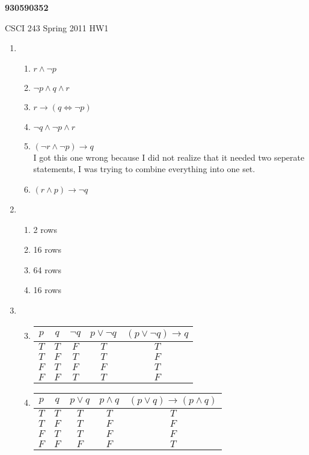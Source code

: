 \documentclass{article}
\begin{document}
\begin{center}{\bf 930590352}

CSCI 243 Spring 2011 HW1
\end{center}
\begin{enumerate}

\item
 \begin{enumerate}
  \item $r \land \neg p$ 
  \item $\neg p \land q \land r$ 
  \item $r \rightarrow (q \iff \neg p)$
  \item $\neg q \land \neg p \land r$
  \item $(\neg r \land \neg p) \rightarrow q$ \\
	I got this one wrong because I did not realize that it needed two seperate statements, I was trying to combine everything into one set.
  \item $(r \land p) \rightarrow \neg q$
 \end{enumerate}

\item
 \begin{enumerate}
  \item 2 rows
  \item 16 rows
  \item 64 rows
  \item 16 rows
 \end{enumerate}

\item
 \begin{enumerate}
  \setcounter{enumii}{2}
  \item
	\begin{tabular}{|c|c|c|c|c|}
	\hline
	$p$ & $q$ & $\neg q$ & $p \lor \neg q$ & $(p \lor \neg q) \rightarrow q$ \\ \hline
	$T$ & $T$ & $F$ & $T$ & $T$ \\ \hline	
	$T$ & $F$ & $T$ & $T$ & $F$ \\ \hline	
	$F$ & $T$ & $F$ & $F$ & $T$ \\ \hline	
	$F$ & $F$ & $T$ & $T$ & $F$ \\ \hline
	\end{tabular}

  \item
	\begin{tabular}{|c|c|c|c|c|}
	\hline
	$p$ & $q$ & $p \lor q$ & $p \land q$ & $(p \lor q) \rightarrow (p \land q)$ \\ \hline
	$T$ & $T$ & $T$ & $T$ & $T$ \\ \hline	
	$T$ & $F$ & $T$ & $F$ & $F$ \\ \hline	
	$F$ & $T$ & $T$ & $F$ & $F$ \\ \hline	
	$F$ & $F$ & $F$ & $F$ & $T$ \\ \hline
	\end{tabular}


\end{enumerate}
\end{enumerate}
\end{document}
